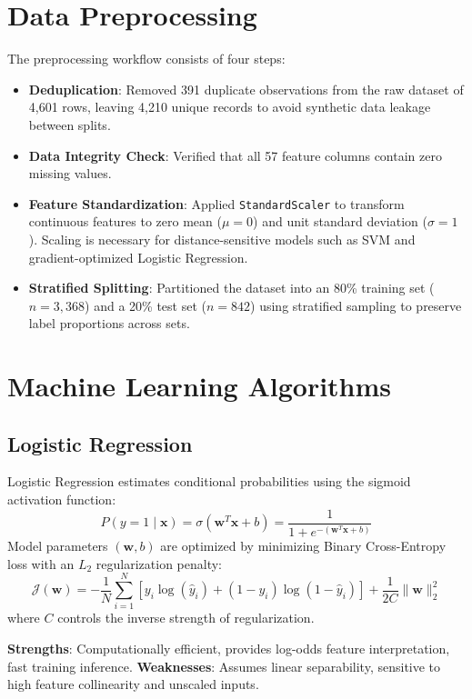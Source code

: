 \documentclass[12pt,a4paper]{article}
\begin{document}
\section{Data Preprocessing}
The preprocessing workflow consists of four steps:
\begin{itemize}[noitemsep]
    \item \textbf{Deduplication}: Removed 391 duplicate observations from the raw dataset of 4,601 rows, leaving 4,210 unique records to avoid synthetic data leakage between splits.
    \item \textbf{Data Integrity Check}: Verified that all 57 feature columns contain zero missing values.
    \item \textbf{Feature Standardization}: Applied \texttt{StandardScaler} to transform continuous features to zero mean ($\mu = 0$) and unit standard deviation ($\sigma = 1$). Scaling is necessary for distance-sensitive models such as SVM and gradient-optimized Logistic Regression.
    \item \textbf{Stratified Splitting}: Partitioned the dataset into an 80\% training set ($n=3,368$) and a 20\% test set ($n=842$) using stratified sampling to preserve label proportions across sets.
\end{itemize}

\section{Machine Learning Algorithms}

\subsection{Logistic Regression}
Logistic Regression estimates conditional probabilities using the sigmoid activation function:
\begin{equation}
P(y = 1 \mid \mathbf{x}) = \sigma(\mathbf{w}^T \mathbf{x} + b) = \frac{1}{1 + e^{-(\mathbf{w}^T \mathbf{x} + b)}}
\end{equation}
Model parameters $(\mathbf{w}, b)$ are optimized by minimizing Binary Cross-Entropy loss with an $L_2$ regularization penalty:
\begin{equation}
\mathcal{J}(\mathbf{w}) = -\frac{1}{N} \sum_{i=1}^N \left[ y_i \log(\hat{y}_i) + (1 - y_i) \log(1 - \hat{y}_i) \right] + \frac{1}{2C} \|\mathbf{w}\|_2^2
\end{equation}
where $C$ controls the inverse strength of regularization.

\textbf{Strengths}: Computationally efficient, provides log-odds feature interpretation, fast training inference.  
\textbf{Weaknesses}: Assumes linear separability, sensitive to high feature collinearity and unscaled inputs.
\end{document}
